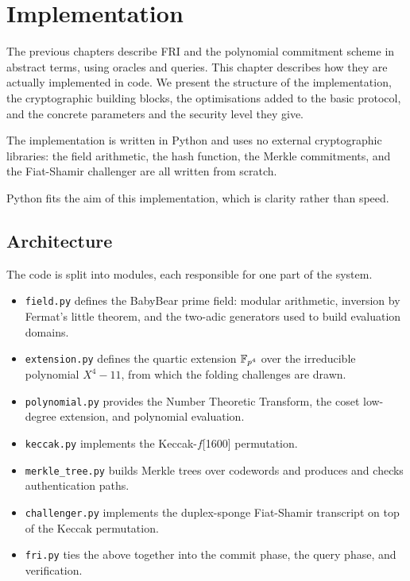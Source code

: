 \chapter{Implementation}
\label{ch:implementation}

The previous chapters describe FRI and the polynomial commitment scheme
in abstract terms, using oracles and queries. This chapter describes how
they are actually implemented in code. We present the structure of the
implementation, the cryptographic building blocks, the optimisations
added to the basic protocol, and the concrete parameters and the
security level they give.

The implementation is written in Python and uses no external
cryptographic libraries: the field arithmetic, the hash function, the
Merkle commitments, and the Fiat-Shamir challenger are all written from
scratch.

Python fits the aim of this implementation, which is clarity rather than speed.


\section{Architecture}
\label{sec:impl_architecture}

The code is split into modules, each responsible for one part of the
system.

\begin{itemize}
  \item \texttt{field.py} defines the BabyBear prime field: modular
    arithmetic, inversion by Fermat's little theorem, and the two-adic
    generators used to build evaluation domains.
  \item \texttt{extension.py} defines the quartic extension $\mathbb{F}_{p^4}$ over
    the irreducible polynomial $X^4 - 11$, from which the folding
    challenges are drawn.
  \item \texttt{polynomial.py} provides the Number Theoretic Transform,
    the coset low-degree extension, and polynomial evaluation.
  \item \texttt{keccak.py} implements the Keccak-$f$[1600] permutation.
  \item \texttt{merkle\_tree.py} builds Merkle trees over codewords and
    produces and checks authentication paths.
  \item \texttt{challenger.py} implements the duplex-sponge Fiat-Shamir
    transcript on top of the Keccak permutation.
  \item \texttt{fri.py} ties the above together into the commit phase,
    the query phase, and verification.
\end{itemize}

